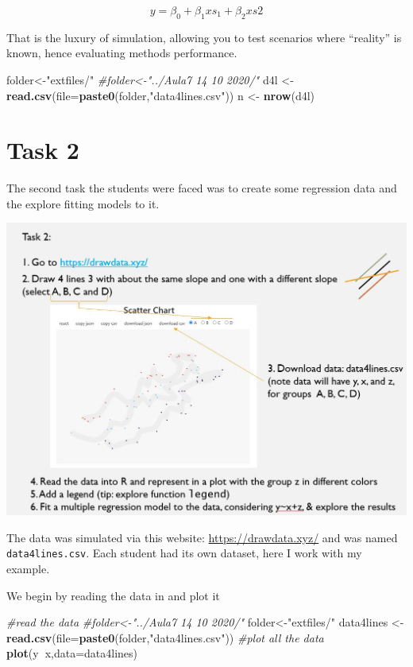 \documentclass[
]{book}
\newenvironment{Shaded}{\begin{snugshade}}{\end{snugshade}}
\newcommand{\CommentTok}[1]{\textcolor[rgb]{0.56,0.35,0.01}{\textit{#1}}}
\newcommand{\DataTypeTok}[1]{\textcolor[rgb]{0.13,0.29,0.53}{#1}}
\newcommand{\KeywordTok}[1]{\textcolor[rgb]{0.13,0.29,0.53}{\textbf{#1}}}
\newcommand{\NormalTok}[1]{#1}
\newcommand{\OperatorTok}[1]{\textcolor[rgb]{0.81,0.36,0.00}{\textbf{#1}}}
\newcommand{\StringTok}[1]{\textcolor[rgb]{0.31,0.60,0.02}{#1}}
\begin{document}
\[y=\beta_0+\beta_1 xs_1+\beta_2 xs2\]

That is the luxury of simulation, allowing you to test scenarios where ``reality'' is known, hence evaluating methods performance.

\begin{Shaded}
\begin{Highlighting}[]
\NormalTok{folder<-}\StringTok{"extfiles/"}
\CommentTok{#folder<-"../Aula7 14 10 2020/"}
\NormalTok{d4l <-}\StringTok{ }\KeywordTok{read.csv}\NormalTok{(}\DataTypeTok{file=}\KeywordTok{paste0}\NormalTok{(folder,}\StringTok{"data4lines.csv"}\NormalTok{))}
\NormalTok{n <-}\StringTok{ }\KeywordTok{nrow}\NormalTok{(d4l)}
\end{Highlighting}
\end{Shaded}

\hypertarget{task-2}{%
\section{Task 2}\label{task-2}}

The second task the students were faced was to create some regression data and the explore fitting models to it.

\includegraphics{extfiles/Aula7Task7.JPG}

The data was simulated via this website: \url{https://drawdata.xyz/} and was named \texttt{data4lines.csv}. Each student had its own dataset, here I work with my example.

We begin by reading the data in and plot it

\begin{Shaded}
\begin{Highlighting}[]
\CommentTok{#read the data}
\CommentTok{#folder<-"../Aula7 14 10 2020/"}
\NormalTok{folder<-}\StringTok{"extfiles/"}
\NormalTok{data4lines <-}\StringTok{ }\KeywordTok{read.csv}\NormalTok{(}\DataTypeTok{file=}\KeywordTok{paste0}\NormalTok{(folder,}\StringTok{"data4lines.csv"}\NormalTok{))}
\CommentTok{#plot all the data}
\KeywordTok{plot}\NormalTok{(y}\OperatorTok{~}\NormalTok{x,}\DataTypeTok{data=}\NormalTok{data4lines)}
\end{Highlighting}
\end{Shaded}
\end{document}
